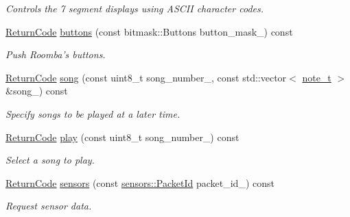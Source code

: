 \begin{DoxyCompactItemize}
\begin{DoxyCompactList}\small\item\em Controls the 7 segment displays using A\+S\+C\+I\+I character codes. \end{DoxyCompactList}\item 
\hyperlink{classroomba_1_1series500_1_1oi_1_1_o_i_command_ab408b9562318caf292794d8ba335d5ed}{Return\+Code} \hyperlink{classroomba_1_1series500_1_1oi_1_1_o_i_command_abca9e8b278ffbc9fb3c00b112139d2c6}{buttons} (const bitmask\+::\+Buttons button\+\_\+mask\+\_\+) const 
\begin{DoxyCompactList}\small\item\em Push Roomba’s buttons. \end{DoxyCompactList}\item 
\hyperlink{classroomba_1_1series500_1_1oi_1_1_o_i_command_ab408b9562318caf292794d8ba335d5ed}{Return\+Code} \hyperlink{classroomba_1_1series500_1_1oi_1_1_o_i_command_a3f9138e69be19f5544bfcc12b2f7a6c8}{song} (const uint8\+\_\+t song\+\_\+number\+\_\+, const std\+::vector$<$ \hyperlink{classroomba_1_1series500_1_1oi_1_1_o_i_command_a43c80e2975163914fa178978b4646b92}{note\+\_\+t} $>$ \&song\+\_\+) const 
\begin{DoxyCompactList}\small\item\em Specify songs to be played at a later time. \end{DoxyCompactList}\item 
\hyperlink{classroomba_1_1series500_1_1oi_1_1_o_i_command_ab408b9562318caf292794d8ba335d5ed}{Return\+Code} \hyperlink{classroomba_1_1series500_1_1oi_1_1_o_i_command_adf069b60bf18b2fbe3121d8649ab0a32}{play} (const uint8\+\_\+t song\+\_\+number\+\_\+) const 
\begin{DoxyCompactList}\small\item\em Select a song to play. \end{DoxyCompactList}\item 
\hyperlink{classroomba_1_1series500_1_1oi_1_1_o_i_command_ab408b9562318caf292794d8ba335d5ed}{Return\+Code} \hyperlink{classroomba_1_1series500_1_1oi_1_1_o_i_command_a469cff47bf8bb707e67860926ffc3b6e}{sensors} (const \hyperlink{namespaceroomba_1_1series500_1_1oi_1_1sensors_a909f47d40452d1cabb85eef642ac04b6}{sensors\+::\+Packet\+Id} packet\+\_\+id\+\_\+) const 
\begin{DoxyCompactList}\small\item\em Request sensor data. \end{DoxyCompactList}\item 

\end{DoxyCompactItemize}
